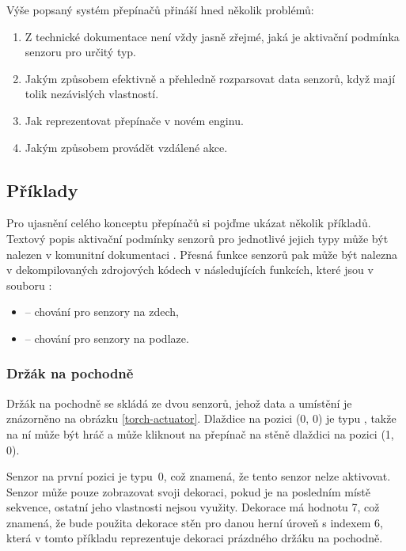 Výše popsaný systém přepínačů přináší hned několik problémů:
\begin{enumerate}[label=\textbf{P\arabic*}]
\item\label{actuator-unclear} Z technické dokumentace \cite{TechnicalDocumentationFontanel05} není vždy jasně zřejmé, jaká je aktivační podmínka senzoru pro určitý typ.
\item\label{actuator-effective} Jakým způsobem efektivně a přehledně rozparsovat data senzorů, když mají tolik nezávislých vlastností.
\item\label{actuator-representation} Jak reprezentovat přepínače v novém enginu.
\item\label{actuator-remote-actions} Jakým způsobem provádět vzdálené akce.
\end{enumerate}

\subsection{Příklady}
Pro ujasnění celého konceptu přepínačů si pojďme ukázat několik příkladů. Textový popis aktivační podmínky senzorů pro jednotlivé 
jejich typy může být nalezen v komunitní dokumentaci \cite{TechnicalDocumentationFontanel05}. Přesná funkce senzorů pak může být nalezna
v dekompilovaných zdrojových kódech \cite{DMDecompilation} v následujících funkcích, které jsou v souboru :

\begin{itemize}
\item {} -- chování pro senzory na zdech,
\item {} -- chování pro senzory na podlaze.
\end{itemize}

\subsubsection{Držák na pochodně}

Držák na pochodně  se skládá ze dvou senzorů, jehož data a umístění je znázorněno na obrázku \ref{torch-actuator}. Dlaždice
na pozici (0, 0) je typu , takže na ní může být hráč a může kliknout na přepínač na stěně dlaždici  na pozici (1, 0).

Senzor na první pozici je typu~0, což znamená, že tento senzor nelze aktivovat. Senzor může pouze zobrazovat svoji dekoraci, pokud je na posledním 
místě sekvence, ostatní jeho vlastnosti nejsou využity. Dekorace má hodnotu 7, což znamená, že bude použita dekorace stěn pro danou herní úroveň
s indexem 6, která v tomto příkladu reprezentuje dekoraci prázdného držáku na pochodně.


